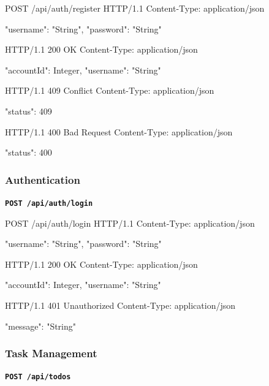 \begin{httpexchange}
\begin{httplisting}
POST /api/auth/register HTTP/1.1
Content-Type: application/json

{
    "username": "String",
    "password": "String"
}
\end{httplisting}
\httpmidarrows
\begin{httplisting}
HTTP/1.1 200 OK
Content-Type: application/json

{
    "accountId": Integer,
    "username": "String"
}

HTTP/1.1 409 Conflict
Content-Type: application/json

{
    "status": 409
}

HTTP/1.1 400 Bad Request
Content-Type: application/json

{
    "status": 400
}
\end{httplisting}
\end{httpexchange}


\newpage



\subsubsection{Authentication}
\textbf{\texttt{POST /api/auth/login}}

\begin{httpexchange}
\begin{httplisting}
POST /api/auth/login HTTP/1.1
Content-Type: application/json

{
    "username": "String",
    "password": "String"
}
\end{httplisting}
\httpmidarrows
\begin{httplisting}
HTTP/1.1 200 OK
Content-Type: application/json

{
    "accountId": Integer,
    "username": "String"
}

HTTP/1.1 401 Unauthorized
Content-Type: application/json

{
    "message": "String"
}
\end{httplisting}
\end{httpexchange}

\subsubsection{Task Management}
\textbf{\texttt{POST /api/todos}}

